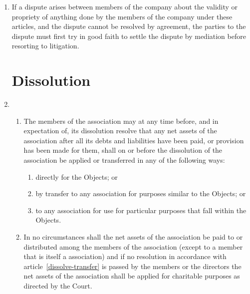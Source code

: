\begin{enumerate}
\item
    If a dispute arises between members of the company about the validity
    or propriety of anything done by the members of the company under these
    articles, and the dispute cannot be resolved by agreement, the parties
    to the dispute must first try in good faith to settle the dispute by
    mediation before resorting to litigation.

\section{Dissolution}

\item
  \begin{enumerate}
  \item\label{dissolve-transfer}
    The members of the association may at any time before, and in
    expectation of, its dissolution resolve that any net assets of the
    association after all its debts and liabilities have been paid, or
    provision has been made for them, shall on or before the
    dissolution of the association be applied or transferred in any of the
    following ways:
    \begin{enumerate}
    \item
      directly for the Objects; or
    \item
      by transfer to any association for purposes similar to the
      Objects; or
    \item
      to any association for use for particular purposes that
      fall within the Objects.
    \end{enumerate}
  \item
    In no circumstances shall the net assets of the association be paid to
    or distributed among the members of the association (except to a member
    that is itself a association) and if no resolution in accordance with
    article~\ref{dissolve-transfer} is passed by the members or the directors the net
    assets of the association shall be applied for charitable purposes as
    directed by the Court.
  \end{enumerate}
\end{enumerate}
